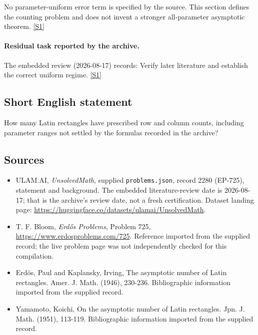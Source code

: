 \documentclass[11pt,a4paper]{article}
\newcommand{\sref}[2]{\hyperlink{source:#1:#2}{[S#2]}}
\begin{document}
No parameter-uniform error term is specified by the source. This section defines the counting problem and does not invent a stronger all-parameter asymptotic theorem. \sref{2280}{1}

\paragraph{Residual task reported by the archive.}

The embedded review (2026-08-17) records: Verify later literature and establish the correct uniform regime. \sref{2280}{1}

\subsection{Short English statement}

How many Latin rectangles have prescribed row and column counts, including parameter ranges not settled by the formulas recorded in the archive?

\subsection{Sources}

{\small

\begin{itemize}

\item[\hypertarget{source:2280:1}{S1}] ULAM.AI, \emph{UnsolvedMath}, supplied \texttt{problems.json}, record 2280 (EP-725), statement and background. The embedded literature-review date is 2026-08-17; that is the archive’s review date, not a fresh certification. Dataset landing page: \url{https://huggingface.co/datasets/ulamai/UnsolvedMath}.

\item[\hypertarget{source:2280:2}{S2}] T. F. Bloom, \emph{Erdős Problems}, Problem 725, \url{https://www.erdosproblems.com/725}. Reference imported from the supplied record; the live problem page was not independently checked for this compilation.

\item[\hypertarget{source:2280:3}{S3}] Erd\"{o}s, Paul and Kaplansky, Irving, The asymptotic number of Latin rectangles. Amer. J. Math. (1946), 230-236. Bibliographic information imported from the supplied record.

\item[\hypertarget{source:2280:4}{S4}] Yamamoto, Koichi, On the asymptotic number of Latin rectangles. Jpn. J. Math. (1951), 113-119. Bibliographic information imported from the supplied record.

\end{itemize}

}

\label{end:2280}
\end{document}

